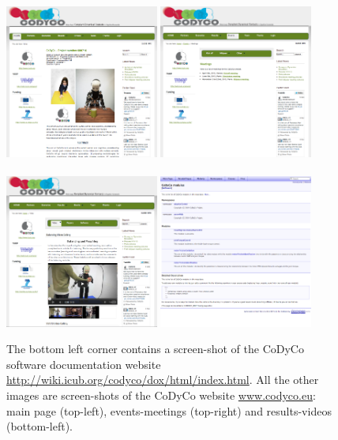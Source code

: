 \documentclass[12pt,a4paper,twoside]{article}
\begin{document}
\begin{figure}[h!]
    \includegraphics[width=0.45\textwidth]{images/mainWeb.png} 
    \includegraphics[width=0.45\textwidth]{images/meetingsWeb.png} \\
\vspace{0.5cm} \\
    \includegraphics[width=0.45\textwidth]{images/videosWeb.png} 
    \includegraphics[width=0.45\textwidth]{images/docWeb.png} \\
\caption{The bottom left corner contains a screen-shot of the CoDyCo software documentation website \protect\url{http://wiki.icub.org/codyco/dox/html/index.html}. All the other images are screen-shots of the CoDyCo website \protect\url{www.codyco.eu}: main page (top-left), events-meetings (top-right) and results-videos (bottom-left).}
\end{figure}
\end{document}

